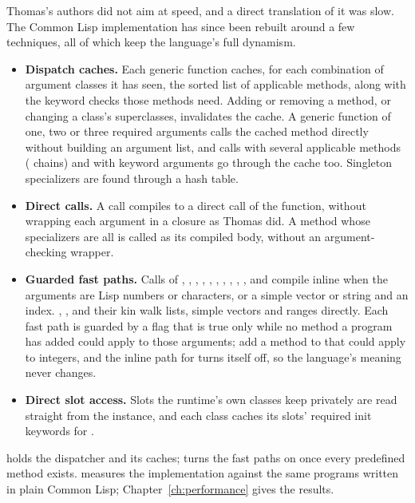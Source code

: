 Thomas's authors did not aim at speed, and a direct translation of it
was slow. The Common Lisp implementation has since been rebuilt around a
few techniques, all of which keep the language's full dynamism.

\begin{itemize}
\item \textbf{Dispatch caches.} Each generic function caches, for each
  combination of argument classes it has seen, the sorted list of
  applicable methods, along with the keyword checks those methods need.
  Adding or removing a method, or changing a class's superclasses,
  invalidates the cache. A generic function of one, two or three
  required arguments calls the cached method directly without building
  an argument list, and calls with several applicable methods
  ( chains) and with keyword arguments go through the
  cache too. Singleton specializers are found through a hash table.
\item \textbf{Direct calls.} A call compiles to a direct call of the
  function, without wrapping each argument in a closure as Thomas did. A
  method whose specializers are all  is called as its
  compiled body, without an argument-checking wrapper.
\item \textbf{Guarded fast paths.} Calls of \code{+}, \code{-},
  \code{*}, \code{<}, \code{>}, \code{<=}, \code{>=}, \code{=},
  , ,  and
   compile inline when the arguments are Lisp
  numbers or characters, or a simple vector or string and an index.
  , ,  and their kin walk lists,
  simple vectors and ranges directly. Each fast path is guarded by a
  flag that is true only while no method a program has added could apply
  to those arguments; add a method to  that could apply to
  integers, and the inline path for \code{+} turns itself off, so the
  language's meaning never changes.
\item \textbf{Direct slot access.} Slots the runtime's own classes keep
  privately are read straight from the instance, and each class caches
  its slots' required init keywords for .
\end{itemize}

\noindent
{} holds the dispatcher and its caches;
 turns the fast paths on once every
predefined method exists.  measures the
implementation against the same programs written in plain Common Lisp;
Chapter~\ref{ch:performance} gives the results.

